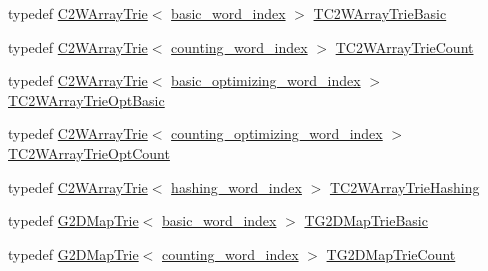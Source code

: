\begin{DoxyCompactItemize}
\item 
typedef \hyperlink{classuva_1_1smt_1_1bpbd_1_1server_1_1lm_1_1_c2_w_array_trie}{C2\+W\+Array\+Trie}$<$ \hyperlink{classuva_1_1smt_1_1bpbd_1_1server_1_1lm_1_1dictionary_1_1basic__word__index}{basic\+\_\+word\+\_\+index} $>$ \hyperlink{namespaceuva_1_1smt_1_1bpbd_1_1server_1_1lm_a454a32eb35e3a62f7c0e1f223955e241}{T\+C2\+W\+Array\+Trie\+Basic}
\item 
typedef \hyperlink{classuva_1_1smt_1_1bpbd_1_1server_1_1lm_1_1_c2_w_array_trie}{C2\+W\+Array\+Trie}$<$ \hyperlink{classuva_1_1smt_1_1bpbd_1_1server_1_1lm_1_1dictionary_1_1counting__word__index}{counting\+\_\+word\+\_\+index} $>$ \hyperlink{namespaceuva_1_1smt_1_1bpbd_1_1server_1_1lm_a6332586fdb6537c927babe65eea4c5dc}{T\+C2\+W\+Array\+Trie\+Count}
\item 
typedef \hyperlink{classuva_1_1smt_1_1bpbd_1_1server_1_1lm_1_1_c2_w_array_trie}{C2\+W\+Array\+Trie}$<$ \hyperlink{namespaceuva_1_1smt_1_1bpbd_1_1server_1_1lm_1_1dictionary_a3001583c904eec702b4a4125082a7ecd}{basic\+\_\+optimizing\+\_\+word\+\_\+index} $>$ \hyperlink{namespaceuva_1_1smt_1_1bpbd_1_1server_1_1lm_a4e48b9bf4c470f14f3598b0cc8b85bed}{T\+C2\+W\+Array\+Trie\+Opt\+Basic}
\item 
typedef \hyperlink{classuva_1_1smt_1_1bpbd_1_1server_1_1lm_1_1_c2_w_array_trie}{C2\+W\+Array\+Trie}$<$ \hyperlink{namespaceuva_1_1smt_1_1bpbd_1_1server_1_1lm_1_1dictionary_a61cbd647b15de785ccf4cdd26661c366}{counting\+\_\+optimizing\+\_\+word\+\_\+index} $>$ \hyperlink{namespaceuva_1_1smt_1_1bpbd_1_1server_1_1lm_ac63a349121a4e9b501809e94b6c9b1c4}{T\+C2\+W\+Array\+Trie\+Opt\+Count}
\item 
typedef \hyperlink{classuva_1_1smt_1_1bpbd_1_1server_1_1lm_1_1_c2_w_array_trie}{C2\+W\+Array\+Trie}$<$ \hyperlink{classuva_1_1smt_1_1bpbd_1_1server_1_1lm_1_1dictionary_1_1hashing__word__index}{hashing\+\_\+word\+\_\+index} $>$ \hyperlink{namespaceuva_1_1smt_1_1bpbd_1_1server_1_1lm_a1be2bc079ca976ffd330763977d42672}{T\+C2\+W\+Array\+Trie\+Hashing}
\item 
typedef \hyperlink{classuva_1_1smt_1_1bpbd_1_1server_1_1lm_1_1_g2_d_map_trie}{G2\+D\+Map\+Trie}$<$ \hyperlink{classuva_1_1smt_1_1bpbd_1_1server_1_1lm_1_1dictionary_1_1basic__word__index}{basic\+\_\+word\+\_\+index} $>$ \hyperlink{namespaceuva_1_1smt_1_1bpbd_1_1server_1_1lm_a0e8dd69db16d3a91b8f4fce171f626b4}{T\+G2\+D\+Map\+Trie\+Basic}
\item 
typedef \hyperlink{classuva_1_1smt_1_1bpbd_1_1server_1_1lm_1_1_g2_d_map_trie}{G2\+D\+Map\+Trie}$<$ \hyperlink{classuva_1_1smt_1_1bpbd_1_1server_1_1lm_1_1dictionary_1_1counting__word__index}{counting\+\_\+word\+\_\+index} $>$ \hyperlink{namespaceuva_1_1smt_1_1bpbd_1_1server_1_1lm_a7bd0f965d2b4e0b52b6986b4209dc3b8}{T\+G2\+D\+Map\+Trie\+Count}

\end{DoxyCompactItemize}
